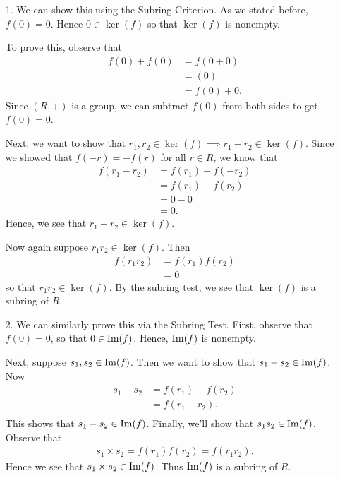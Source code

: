     \begin{prf}
        \begin{itemize}
            \item[1.] We can show this using the Subring Criterion.
            As we stated before, $f(0) = 0$. Hence $0 \in
            \ker(f)$ so that $\ker(f)$ is nonempty. 

            To prove this, observe that 
            \begin{align*}
                f(0) + f(0) & = f(0 + 0)\\
                & = (0)\\
                & = f(0) + 0.
            \end{align*}
            Since $(R, +)$ is a group, we can subtract $f(0)$
            from both sides to get $f(0) = 0$.

            Next, we want to show that $r_1, r_2 \in \ker(f)
            \implies r_1 - r_2 \in \ker(f)$. Since we showed that
            $f(-r) = -f(r)$ for all $r \in R$, we know that 
            \begin{align*}
                f(r_1 - r_2) & = f(r_1) + f(-r_2)\\
                & = f(r_1) - f(r_2)\\
                & = 0 - 0\\
                & = 0.
            \end{align*}
            Hence, we see that $r_1 - r_2 \in \ker(f)$. 

            Now again suppose $r_1r_2 \in \ker(f)$. Then 
            \begin{align*}
                f(r_1r_2) & = f(r_1)f(r_2)\\
                & = 0
            \end{align*}
            so that $r_1r_2 \in \ker(f)$. By the subring test, we
            see that $\ker(f)$ is a subring of $R$. 

            \item[2.] We can similarly prove this via the Subring
            Test. First, observe that $f(0) = 0$, so that $0 \in
            \mbox{Im}(f)$. Hence, $\mbox{Im}(f)$ is nonempty. 

            Next, suppose $s_1, s_2 \in \mbox{Im}(f)$. Then we want to
            show that $s_1 - s_2 \in \mbox{Im}(f)$. Now 
            \begin{align*}
                s_1 - s_2 & = f(r_1) - f(r_2)\\
                & =f(r_1 - r_2).\\
            \end{align*}
            This shows that $s_1 - s_2 \in \mbox{Im}(f)$. Finally, we'll
            show that $s_1s_2 \in \mbox{Im}(f)$. Observe that 
            \begin{align*}
                s_1 \times s_2 = f(r_1)f(r_2) = f(r_1r_2).
            \end{align*}
            Hence we see that $s_1\times s_2 \in \mbox{Im}(f)$. Thus
            $\mbox{Im}(f)$ is a subring of $R$. 
        \end{itemize}            
    \end{prf}
